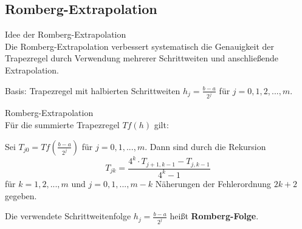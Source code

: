 \subsection{Romberg-Extrapolation}

\begin{concept}{Idee der Romberg-Extrapolation}\\
Die Romberg-Extrapolation verbessert systematisch die Genauigkeit der Trapezregel durch Verwendung mehrerer Schrittweiten und anschließende Extrapolation.

Basis: Trapezregel mit halbierten Schrittweiten $h_j = \frac{b-a}{2^j}$ für $j = 0, 1, 2, ..., m$.
\end{concept}

\begin{theorem}{Romberg-Extrapolation}\\
Für die summierte Trapezregel $Tf(h)$ gilt:

Sei $T_{j0} = Tf\left(\frac{b-a}{2^j}\right)$ für $j = 0, 1, ..., m$. Dann sind durch die Rekursion
$$T_{jk} = \frac{4^k \cdot T_{j+1,k-1} - T_{j,k-1}}{4^k - 1}$$
für $k = 1, 2, ..., m$ und $j = 0, 1, ..., m-k$ Näherungen der Fehlerordnung $2k+2$ gegeben.

Die verwendete Schrittweitenfolge $h_j = \frac{b-a}{2^j}$ heißt \textbf{Romberg-Folge}.
\end{theorem}

